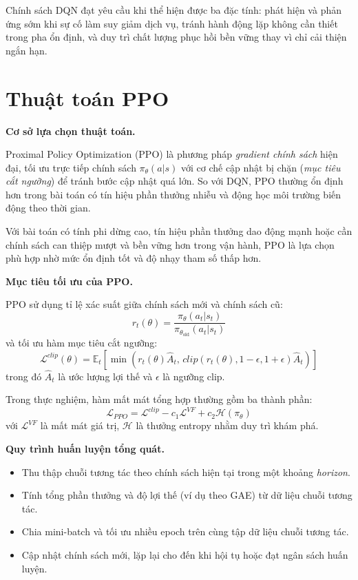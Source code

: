 \noindent Chính sách DQN đạt yêu cầu khi thể hiện được ba đặc tính: phát hiện và phản ứng sớm khi sự cố làm suy giảm dịch vụ, tránh hành động lặp không cần thiết trong pha ổn định, và duy trì chất lượng phục hồi bền vững thay vì chỉ cải thiện ngắn hạn.

\section{Thuật toán PPO}

\noindent\textbf{Cơ sở lựa chọn thuật toán.}

\noindent Proximal Policy Optimization (PPO) là phương pháp \textit{gradient chính sách} hiện đại, tối ưu trực tiếp chính sách $\pi_\theta(a|s)$ với cơ chế cập nhật bị chặn (\textit{mục tiêu cắt ngưỡng}) để tránh bước cập nhật quá lớn. So với DQN, PPO thường ổn định hơn trong bài toán có tín hiệu phần thưởng nhiễu và động học môi trường biến động theo thời gian.

\noindent Với bài toán có tính phi dừng cao, tín hiệu phần thưởng dao động mạnh hoặc cần chính sách can thiệp mượt và bền vững hơn trong vận hành, PPO là lựa chọn phù hợp nhờ mức ổn định tốt và độ nhạy tham số thấp hơn.

\noindent\textbf{Mục tiêu tối ưu của PPO.}

\noindent PPO sử dụng tỉ lệ xác suất giữa chính sách mới và chính sách cũ:
\[
r_t(\theta) = \frac{\pi_\theta(a_t|s_t)}{\pi_{\theta_{\text{old}}}(a_t|s_t)}
\]
và tối ưu hàm mục tiêu cắt ngưỡng:
\[
\mathcal{L}^{clip}(\theta)=
\mathbb{E}_t
\left[
\min\left(
r_t(\theta)\hat{A}_t,\,
clip(r_t(\theta),1-\epsilon,1+\epsilon)\hat{A}_t
\right)
\right]
\]
trong đó $\hat{A}_t$ là ước lượng lợi thế và $\epsilon$ là ngưỡng clip.

\noindent Trong thực nghiệm, hàm mất mát tổng hợp thường gồm ba thành phần:
\[
\mathcal{L}_{PPO}
=
\mathcal{L}^{clip}
- c_1 \mathcal{L}^{VF}
+ c_2 \mathcal{H}(\pi_\theta)
\]
với $\mathcal{L}^{VF}$ là mất mát giá trị, $\mathcal{H}$ là thưởng entropy nhằm duy trì khám phá.

\noindent\textbf{Quy trình huấn luyện tổng quát.}
\begin{itemize}
    \item Thu thập chuỗi tương tác theo chính sách hiện tại trong một khoảng \textit{horizon}.
    \item Tính tổng phần thưởng và độ lợi thế (ví dụ theo GAE) từ dữ liệu chuỗi tương tác.
    \item Chia mini-batch và tối ưu nhiều epoch trên cùng tập dữ liệu chuỗi tương tác.
    \item Cập nhật chính sách mới, lặp lại cho đến khi hội tụ hoặc đạt ngân sách huấn luyện.
\end{itemize}

